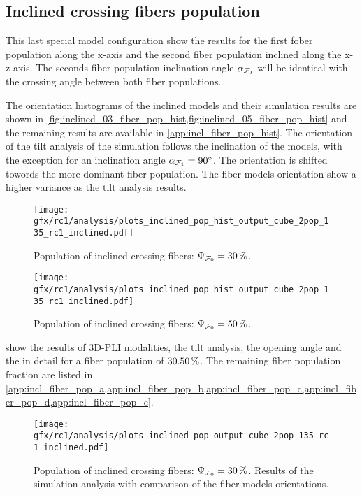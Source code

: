 \subsection{Inclined crossing fibers population}
\label{sec:resInclCross}
% 
This last special model configuration show the results for the first fober population \popa{} along the x-axis and the second fiber population inclined along the x-z-axis.
The seconds fiber population inclination angle $\textnormal{$\alpha$}_{\textnormal{$\mathcal{F}_1$}}$ will be identical with the crossing angle \modelOmega{} between both fiber populations.
\par
%
The orientation histograms of the inclined models and their simulation results are shown in \cref{fig:inclined_03_fiber_pop_hist,fig:inclined_05_fiber_pop_hist} and the remaining results are available in \cref{app:incl_fiber_pop_hist}.
The orientation of the tilt analysis of the simulation follows the inclination of the models, with the exception for an inclination angle $\textnormal{$\alpha$}_{\textnormal{$\mathcal{F}_1$}} = \SI{90}{\degree}$.
The orientation is shifted towords the more dominant fiber population.
The fiber models orientation show a higher variance as the tilt analysis results.
\par
%
\begin{figure}[!p]
\centering
\texttt{[image: gfx/rc1/analysis/plots\_inclined\_pop\_hist\_output\_cube\_2pop\_135\_rc1\_inclined.pdf]}
\caption{Population of inclined crossing fibers: $\textnormal{$\Psi_{\textnormal{$\mathcal{F}_0$}}$}=\SI{30}{\percent}$.
}
\label{fig:inclined_03_fiber_pop_hist}
% 
\vspace{2em}
\texttt{[image: gfx/rc1/analysis/plots\_inclined\_pop\_hist\_output\_cube\_2pop\_135\_rc1\_inclined.pdf]}
\caption{Population of inclined crossing fibers: $\textnormal{$\Psi_{\textnormal{$\mathcal{F}_0$}}$}=\SI{50}{\percent}$.
}
\label{fig:inclined_05_fiber_pop_hist}
\end{figure}
%
 show the results of \ac{3D-PLI} modalities, the tilt analysis, the opening angle and the \accvalue{} in detail for a fiber population of $\SIlist{30,50}{\percent}$.%
The remaining fiber population fraction are listed in \cref{app:incl_fiber_pop_a,app:incl_fiber_pop_b,app:incl_fiber_pop_c,app:incl_fiber_pop_d,app:incl_fiber_pop_e}.
\par
%
\begin{figure}[!p]
    \centering
    \texttt{[image: gfx/rc1/analysis/plots\_inclined\_pop\_output\_cube\_2pop\_135\_rc1\_inclined.pdf]}
    \caption{Population of inclined crossing fibers: $\textnormal{$\Psi_{\textnormal{$\mathcal{F}_0$}}$}=\SI{30}{\percent}$. Results of the simulation analysis with comparison of the fiber models orientations.}
    \label{fig:inclined_03_fiber_pop_rofl}
    \end{figure}
